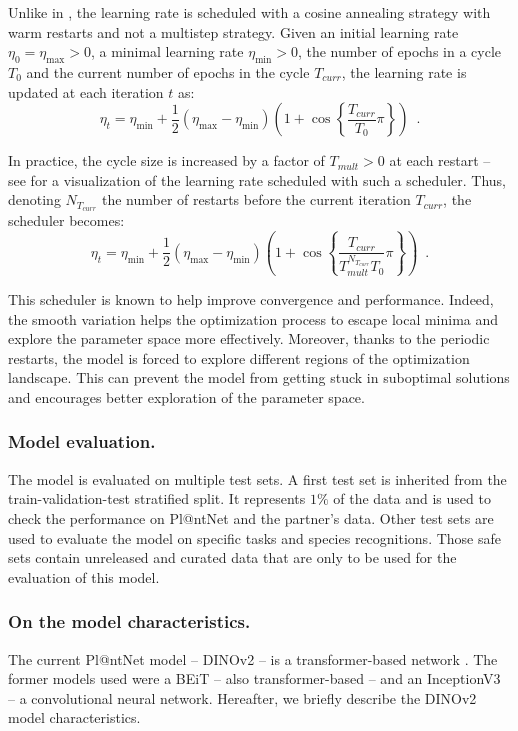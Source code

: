 Unlike in , the learning rate is scheduled with a cosine annealing strategy with warm restarts \citep{loshchilov2016sgdr} and not a multistep strategy.
Given an initial learning rate $\eta_0=\eta_{\max}>0$, a minimal learning rate $\eta_{\min}>0$, the number of epochs in a cycle $T_0$ and the current number of epochs in  the cycle $T_{curr}$, the learning rate is updated at each iteration $t$ as:
\[
\eta_t = \eta_{\min} + \frac{1}{2}(\eta_{\max} - \eta_{\min})\left(   1+ \cos\left\{ \frac{T_{curr}}{T_0}\pi \right\}\right)    \enspace.
\]

In practice, the cycle size is increased by a factor of $T_{mult}>0$ at each restart -- see  for a visualization of the learning rate scheduled with such a scheduler. Thus, denoting $N_{T_{curr}}$ the number of restarts before the current iteration $T_{curr}$, the scheduler becomes:
\[
\eta_t = \eta_{\min} + \frac{1}{2}(\eta_{\max} - \eta_{\min})\left(   1+ \cos\left\{ \frac{T_{curr}}{T_{mult}^{N_{T_{curr}}}T_0}\pi \right\}\right)    \enspace.
\]

This scheduler is known to help improve convergence and performance.
Indeed, the smooth variation helps the optimization process to escape local minima and explore the parameter space more effectively.
Moreover, thanks to the periodic restarts, the model is forced to explore different regions of the optimization landscape. This can prevent the model from getting stuck in suboptimal solutions and encourages better exploration of the parameter space.

\subsubsection{Model evaluation.}

The model is evaluated on multiple test sets.
A first test set is inherited from the train-validation-test stratified split.
It represents $1\%$ of the data and is used to check the performance on Pl@ntNet and the partner's data.
Other test sets are used to evaluate the model on specific tasks and species recognitions.
Those safe sets contain unreleased and curated data that are only to be used for the evaluation of this model.

\subsubsection{On the model characteristics.}

The current Pl@ntNet model -- DINOv2 \citep{oquab2024dinov2} -- is a transformer-based network \citep{dosovitskiy2020image}.
The former models used were a BEiT \citep{bao2021beit} -- also transformer-based -- and an InceptionV3 \citep{szegedy2015rethinking} -- a convolutional neural network.
Hereafter, we briefly describe the DINOv2 model characteristics.

